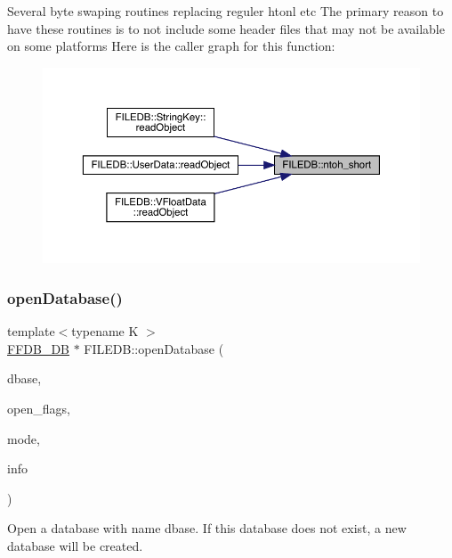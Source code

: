 Several byte swaping routines replacing reguler htonl etc The primary reason to have these routines is to not include some header files that may not be available on some platforms Here is the caller graph for this function\+:
\nopagebreak
\begin{figure}[H]
\begin{center}
\leavevmode
\includegraphics[width=350pt]{d2/de6/namespaceFILEDB_af28aef063f95fcb331d3844f6807daf5_icgraph}
\end{center}
\end{figure}
\mbox{\label{namespaceFILEDB_a9ed602db52c9c9d3bbf1324426376c72}} 
\subsubsection{\texorpdfstring{openDatabase()}{openDatabase()}}
{\footnotesize\ttfamily template$<$typename K $>$ \\
\mbox{\hyperlink{adat-devel_2other__libs_2filedb_2filehash_2ffdb__db_8h_a0b27b956926453a7a8141ea8e10f0df8}{F\+F\+D\+B\+\_\+\+DB}} $\ast$ F\+I\+L\+E\+D\+B\+::open\+Database (\begin{DoxyParamCaption}\item[{const std\+::string \&}]{dbase,  }\item[{int}]{open\+\_\+flags,  }\item[{int}]{mode,  }\item[{\mbox{\hyperlink{structFFDB__HASHINFO}{F\+F\+D\+B\+\_\+\+H\+A\+S\+H\+I\+N\+FO}} $\ast$}]{info }\end{DoxyParamCaption})}

Open a database with name dbase. If this database does not exist, a new database will be created.



